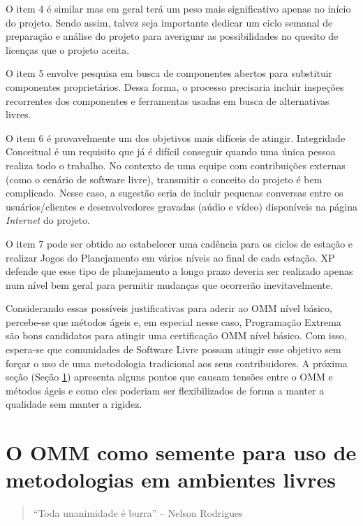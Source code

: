 O item 4 é similar mas em geral terá um peso mais significativo apenas
no início do projeto. Sendo assim, talvez seja importante dedicar um
ciclo semanal de preparação e análise do projeto para averiguar as
possibilidades no quesito de licenças que o projeto aceita.

O item 5 envolve pesquisa em busca de componentes abertos para
substituir componentes proprietários. Dessa forma, o processo
precisaria incluir inspeções recorrentes dos componentes e ferramentas
usadas em busca de alternativas livres.

O item 6 é provavelmente um dos objetivos mais difíceis de
atingir. Integridade Conceitual é um requisito que já é difícil
conseguir quando uma única pessoa realiza todo o trabalho. No contexto
de uma equipe com contribuições externas (como o cenário de software
livre), transmitir o conceito do projeto é bem complicado. Nesse caso,
a sugestão seria de incluir pequenas conversas entre os
usuários/clientes e desenvolvedores gravadas (aúdio e vídeo)
disponíveis na página \textit{Internet} do projeto.

O item 7 pode ser obtido ao estabelecer uma cadência para os ciclos de
estação e realizar Jogos do Planejamento em vários níveis ao final de
cada estação. XP defende que esse tipo de planejamento a longo prazo
deveria ser realizado apenas num nível bem geral para permitir
mudanças que ocorrerão inevitavelmente.

Considerando essas possíveis justificativas para aderir ao OMM nível
básico, percebe-se que métodos ágeis e, em especial nesse caso,
Programação Extrema são bons candidatos para atingir uma certificação
OMM nível básico. Com isso, espera-se que comunidades de Software
Livre possam atingir esse objetivo sem forçar o uso de uma metodologia
tradicional aos seus contribuidores. A próxima seção (Seção
\ref{sec:sl+omm}) apresenta alguns pontos que causam tensões
entre o OMM e métodos ágeis e como eles poderiam ser flexibilizados de
forma a manter a qualidade sem manter a rigidez.

\section[OMM no contexto livre]{O OMM como semente para uso de
  metodologias em ambientes livres}
\label{sec:sl+omm}

\begin{quote}
  ``Toda unanimidade é burra'' -- Nelson Rodrigues
\end{quote}

